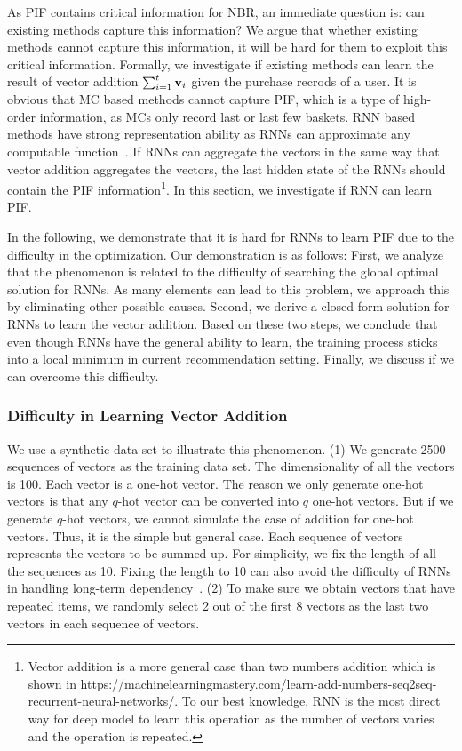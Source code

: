 \documentclass[sigconf]{acmart}
\begin{document}
As PIF contains critical  information for NBR, an  immediate question is: can existing  methods capture this  information? We argue that whether  existing methods cannot capture this information, it will be hard for them to exploit this  critical information. Formally, we investigate if existing methods can learn the result of vector  addition  $\small\sum_{i=1}^t\mathbf{v}_i$ given the purchase recrods of a user. It is obvious that MC based methods cannot capture PIF, which is a type of high-order information, as MCs  only record last or last few  baskets. RNN based methods  have strong representation ability as RNNs can approximate any  computable  function~\cite{siegelmann1992computational}.  If RNNs can  aggregate the vectors in the same way that vector addition aggregates the  vectors, the last hidden state of the RNNs should contain the PIF information\footnote{Vector addition is a  more general case than two numbers addition which is shown in https://machinelearningmastery.com/learn-add-numbers-seq2seq-recurrent-neural-networks/. To our best knowledge, RNN is the most direct way for deep model to learn this operation as the number of vectors varies and the operation is repeated.}. In this section, we investigate if RNN can learn PIF. 

In the following, we  demonstrate that it is hard  for RNNs to learn PIF due to the  difficulty in the optimization. Our demonstration is as follows: First, we  analyze that the phenomenon is  related to the difficulty of searching the global  optimal solution for RNNs. As many  elements can lead to this problem, we  approach this  by eliminating other possible  causes. Second, we derive  a closed-form solution for  RNNs to learn the vector addition. Based on these two steps, we conclude that  even though RNNs have the general ability to learn, the training process sticks  into a local  minimum in current  recommendation setting. Finally, we discuss if we can overcome this  difficulty.

\subsubsection{Difficulty in Learning Vector Addition}

We use a  synthetic data set to illustrate this phenomenon. (1) We generate  2500 sequences of vectors  as the training data set. The dimensionality of all the vectors is  100. Each vector is a one-hot vector. The reason we only generate one-hot vectors is that any $q$-hot vector can be converted into $q$ one-hot vectors. But if we generate $q$-hot vectors, we cannot simulate the  case of  addition for  one-hot  vectors.  Thus, it is the simple but  general case.   Each sequence of vectors represents the vectors to be summed up. For simplicity, we fix the length of all the sequences  as 10. Fixing the length to  10 can also avoid the  difficulty  of RNNs in handling long-term dependency~\cite{pascanu2013difficulty}. (2) To make sure we obtain vectors that have  repeated items, we randomly select 2 out of the first 8 vectors as the last two vectors in each sequence of vectors. 
\end{document}
